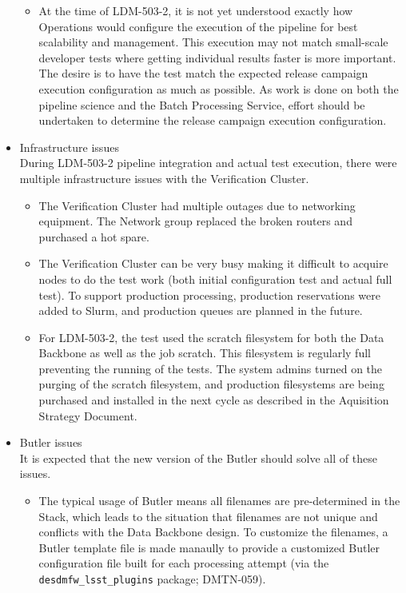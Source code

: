 \documentclass[DM,lsstdraft,STR,toc]{lsstdoc}
\begin{document}
\begin{itemize}
\begin{itemize}
  \item At the time of LDM-503-2, it is not yet understood exactly
  how Operations would configure the execution of the pipeline for 
  best scalability and management.  This execution may not match 
  small-scale developer tests where getting individual results 
  faster is more important.  The desire is to have the
  test match the expected release campaign execution configuration
  as much as possible.   As work is done on both the pipeline 
  science and the Batch Processing Service, effort should be
  undertaken to determine the release campaign execution
  configuration.
\end{itemize}
  \item Infrastructure issues \\
  During LDM-503-2 pipeline integration and actual test execution,
  there were multiple infrastructure issues with the Verification
  Cluster.
  \begin{itemize}
    \item The Verification Cluster had multiple outages due to
networking equipment.    The Network group replaced the
broken routers and purchased a hot spare.
    \item The Verification Cluster can be very busy making it
difficult to acquire nodes to do the test work (both initial
configuration test and actual full test).  To support production 
processing, production reservations were added to Slurm, and production
queues are planned in the future.
    \item For LDM-503-2, the test used the scratch filesystem
for both the Data Backbone as well as the job scratch.  This
filesystem is regularly full preventing the running of the 
tests.   The system admins turned on the purging of the scratch 
filesystem, and production filesystems are being purchased
and installed in the next cycle as described in the Aquisition 
Strategy Document. 
  \end{itemize}

  \item Butler issues \\
    It is expected that the new version of the Butler should
    solve all of these issues.
    \begin{itemize}
    \item The typical usage of Butler means all filenames are
	  pre-determined in the Stack, which leads to the situation
	  that filenames are not unique and conflicts with the 
	  Data Backbone design.   To customize the filenames, 
      a Butler template file is made manaully to provide a 
      customized Butler configuration file built for each 
      processing attempt (via
	  the \texttt{desdmfw{\_}lsst{\_}plugins} package; DMTN-059).


\end{itemize}
\end{itemize}
\end{document}
